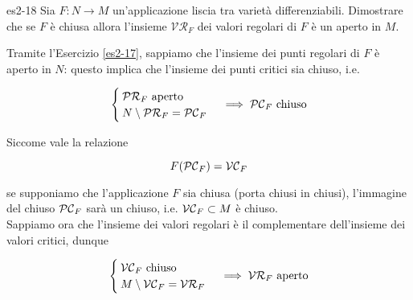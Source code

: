 
{es2-18}
{
Sia $ F : N \to M $ un'applicazione liscia tra varietà differenziabili. Dimostrare che se $ F $ è chiusa allora l'insieme $ \mathcal{VR}_{F} $ dei valori regolari di $ F $ è un aperto in $ M $.
}
{
Tramite l'Esercizio \ref{es2-17}, sappiamo che l'insieme dei punti regolari di $ F $ è aperto in $ N $: questo implica che l'insieme dei punti critici sia chiuso, i.e.

\begin{equation}
	\begin{cases}
		\PR_{F} \text{ aperto} \\
		N \setminus \PR_{F} = \PC_{F}
	\end{cases} %
	\implies %
	\PC_{F} \text{ chiuso}
\end{equation}

Siccome vale la relazione

\begin{equation}
	F(\mathcal{PC}_{F}) = \mathcal{VC}_{F}
\end{equation}

se supponiamo che l'applicazione $ F $ sia chiusa (porta chiusi in chiusi), l'immagine del chiuso $ \mathcal{PC}_{F} $ sarà un chiuso, i.e. $ \mathcal{VC}_{F} \subset M $ è chiuso. \\
Sappiamo ora che l'insieme dei valori regolari è il complementare dell'insieme dei valori critici, dunque

\begin{equation}
	\begin{cases}
		\VC_{F} \text{ chiuso} \\
		M \setminus \VC_{F} = \VR_{F}
	\end{cases} %
	\implies %
	\VR_{F} \text{ aperto}
\end{equation}
}


